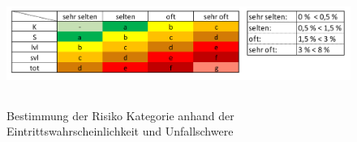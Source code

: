 \begin{savenotes}
	\begin{figure}[H]
		\centering
		\includegraphics[width=16cm,height=4cm]{figures/Eintrittswahrscheinlichkeit}
		\caption[Bestimmung der Risiko Kategorie anhand der Eintrittswahrscheinlichkeit und Unfallschwer]{Bestimmung der Risiko Kategorie anhand der Eintrittswahrscheinlichkeit und Unfallschwere}\label{fig:Eintrittswahrscheinlichkeit}
	\end{figure}
\end{savenotes}



